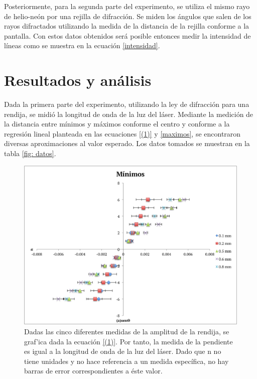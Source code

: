 \documentclass[%
 reprint,
 amsmath,amssymb,
 aps,
]{revtex4-1}
\begin{document}
Posteriormente, para la segunda parte del experimento, se utiliza el mismo rayo de helio-neón por una rejilla de difracción. Se miden los ángulos que salen de los rayos difractados utilizando la medida de la distancia de la rejilla conforme a la pantalla. Con estos datos obtenidos será posible entonces medir la intensidad de líneas como se muestra en la ecuación \eqref{intensidad}.

\section{\label{resultados} Resultados y análisis}

Dada la primera parte del experimento, utilizando la ley de difracción para una rendija, se midió la longitud de onda de la luz del láser. Mediante la medición de la distancia entre mínimos y máximos conforme el centro y conforme a la regresión lineal planteada en las ecuaciones \eqref{(1)} y \eqref{maximos}, se encontraron diversas aproximaciones al valor esperado. Los datos tomados se muestran en la tabla \ref{fig: datos}.

\begin{figure}[H]
    \centering
    \includegraphics[scale= 0.43]{minimos.png}
    \caption{Dadas las cinco diferentes medidas de la amplitud de la rendija, se graf'ica dada la ecuación \eqref{(1)}. Por tanto, la medida de la pendiente es igual a la longitud de onda de la luz del láser. Dado que n no tiene unidades y no hace referencia a un medida específica, no hay barras de error correspondientes a éste valor.}
    \label{fig:minimos}
\end{figure}
\end{document}
